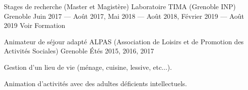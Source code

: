 \begin{cventries}
\vspace{.5cm}

\cventry
{Stages de recherche (Master et Magistère)}
{Laboratoire TIMA (Grenoble INP)}
{Grenoble}
{Juin 2017 --- Août 2017, Mai 2018 --- Août 2018, Février 2019 --- Août 2019}
{Voir Formation}

\cventry
{Animateur de séjour adapté} %
{ALPAS (Association de Loisirs et de Promotion des Activités Sociales)} %
{Grenoble} %
{Étés 2015, 2016, 2017} %
{ %
\begin{cvitems}
\item Gestion d'un lieu de vie (ménage, cuisine, lessive, etc...).
\item Animation d'activités avec des adultes déficients intellectuels.
\end{cvitems}
}


\end{cventries}